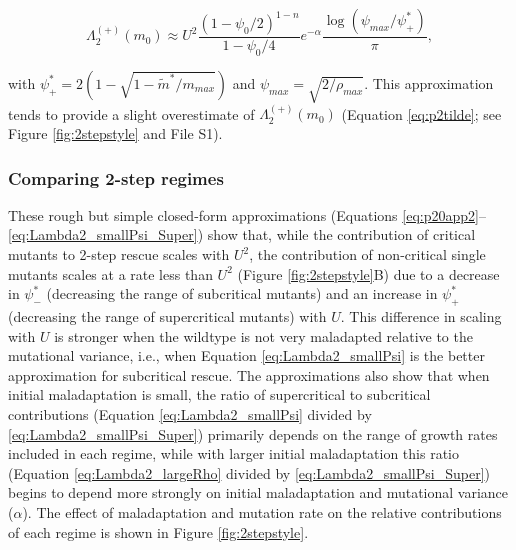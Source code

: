 \documentclass[9pt,twocolumn,twoside,lineno]{gsajnl}
\begin{document}
\begin{equation}\label{eq:Lambda2_smallPsi_Super}
\Lambda_2^{(+)}(m_0) \approx U^2 \frac{(1-\psi_0/2)^{1-n}}{1-\psi_0/4} e^{-\alpha} \frac{\log(\psi_{max} / \psi^*_{+})}{\pi},
\end{equation}

\noindent with $\psi^*_{+} = 2(1-\sqrt{1 - \tilde{m}^*/m_{max}})$ and $\psi_{max} = \sqrt{2/\rho_{max}}$.
This approximation tends to provide a slight overestimate of $\Lambda_2^{(+)}(m_0)$ (Equation \ref{eq:p2tilde}; see Figure \ref{fig:2stepstyle} and File S1).

\subsubsection{Comparing 2-step regimes}

These rough but simple closed-form approximations (Equations \ref{eq:p20app2}--\ref{eq:Lambda2_smallPsi_Super}) show that, while the contribution of critical mutants to 2-step rescue scales with $U^2$, the contribution of non-critical single mutants scales at a rate less than $U^2$ (Figure \ref{fig:2stepstyle}B) due to a decrease in $\psi^*_-$ (decreasing the range of subcritical mutants) and an increase in $\psi^*_+$ (decreasing the range of supercritical mutants) with $U$.
This difference in scaling with $U$ is stronger when the wildtype is not very maladapted relative to the mutational variance, i.e., when Equation \ref{eq:Lambda2_smallPsi} is the better approximation for subcritical rescue.
The approximations also show that when initial maladaptation is small, the ratio of supercritical to subcritical contributions (Equation \ref{eq:Lambda2_smallPsi} divided by \ref{eq:Lambda2_smallPsi_Super}) primarily depends on the range of growth rates included in each regime, while with larger initial maladaptation this ratio (Equation \ref{eq:Lambda2_largeRho} divided by \ref{eq:Lambda2_smallPsi_Super}) begins to depend more strongly on initial maladaptation and mutational variance ($\alpha$).
The effect of maladaptation and mutation rate on the relative contributions of each regime is shown in Figure \ref{fig:2stepstyle}.
\end{document}
